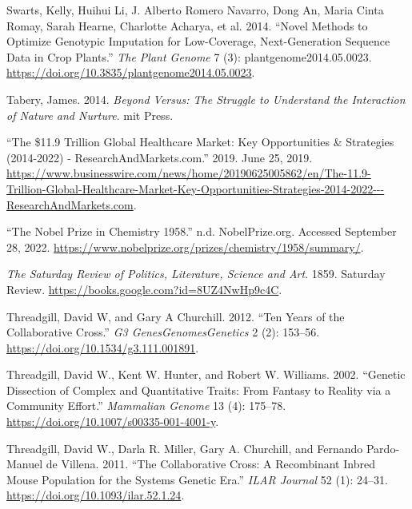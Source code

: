 \documentclass[
]{book}
\newlength{\cslhangindent}
\newlength{\cslentryspacingunit} %
\newenvironment{CSLReferences}[2] %
 {%
  \setlength{\parindent}{0pt}
  \ifodd #1
  \let\oldpar\par
  \def\par{\hangindent=\cslhangindent\oldpar}
  \fi
  \setlength{\parskip}{#2\cslentryspacingunit}
 }%
 {}
\begin{document}
\begin{CSLReferences}{1}{0}
\leavevmode{}%
Swarts, Kelly, Huihui Li, J. Alberto Romero Navarro, Dong An, Maria Cinta Romay, Sarah Hearne, Charlotte Acharya, et al. 2014. {``Novel {Methods} to {Optimize Genotypic Imputation} for {Low-Coverage}, {Next-Generation Sequence Data} in {Crop Plants}.''} \emph{The Plant Genome} 7 (3): plantgenome2014.05.0023. \url{https://doi.org/10.3835/plantgenome2014.05.0023}.

\leavevmode{}%
Tabery, James. 2014. \emph{Beyond Versus: {The} Struggle to Understand the Interaction of Nature and Nurture}. {mit Press}.

\leavevmode{}%
{``The \$11.9 {Trillion Global Healthcare Market}: {Key Opportunities} \& {Strategies} (2014-2022) - {ResearchAndMarkets}.com.''} 2019. June 25, 2019. \url{https://www.businesswire.com/news/home/20190625005862/en/The-11.9-Trillion-Global-Healthcare-Market-Key-Opportunities-Strategies-2014-2022---ResearchAndMarkets.com}.

\leavevmode{}%
{``The {Nobel Prize} in {Chemistry} 1958.''} n.d. {NobelPrize.org}. Accessed September 28, 2022. \url{https://www.nobelprize.org/prizes/chemistry/1958/summary/}.

\leavevmode{}%
\emph{The {Saturday Review} of {Politics}, {Literature}, {Science} and {Art}}. 1859. {Saturday Review}. \url{https://books.google.com?id=8UZ4NwHp9c4C}.

\leavevmode{}%
Threadgill, David W, and Gary A Churchill. 2012. {``Ten {Years} of the {Collaborative Cross}.''} \emph{G3 Genes\textbar Genomes\textbar Genetics} 2 (2): 153--56. \url{https://doi.org/10.1534/g3.111.001891}.

\leavevmode{}%
Threadgill, David W., Kent W. Hunter, and Robert W. Williams. 2002. {``Genetic Dissection of Complex and Quantitative Traits: From Fantasy to Reality via a Community Effort.''} \emph{Mammalian Genome} 13 (4): 175--78. \url{https://doi.org/10.1007/s00335-001-4001-y}.

\leavevmode{}%
Threadgill, David W., Darla R. Miller, Gary A. Churchill, and Fernando Pardo-Manuel de Villena. 2011. {``The {Collaborative Cross}: {A Recombinant Inbred Mouse Population} for the {Systems Genetic Era}.''} \emph{ILAR Journal} 52 (1): 24--31. \url{https://doi.org/10.1093/ilar.52.1.24}.


\end{CSLReferences}
\end{document}
